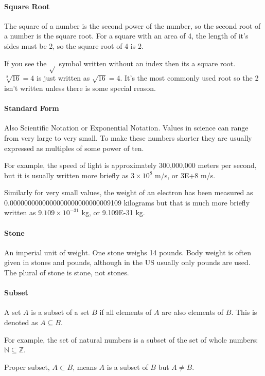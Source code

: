 \documentclass[12pt]{article}
\begin{document}
\paragraph{Square Root}
The square of a number is the second power of the number, so the second root of a number is the square root. For a square with an area of 4, the length of it’s sides must be 2, so the square root of 4 is 2.

If you see the $\sqrt{}$ symbol written without an index then its a square root.  $\sqrt[2]{16} = 4$ is just written as $\sqrt{16} = 4.$ It’s the most commonly used root so the 2 isn’t written unless there is some special reason.

\paragraph{Standard Form}
Also Scientific Notation or Exponential Notation. Values in science can range from very large to very small. To make these numbers shorter they are usually expressed as multiples of some power of ten.

For example, the speed of light is approximately 300,000,000 meters per second, but it is usually written more briefly as $3\times10^8$ m/s, or 3E+8 m/s.

Similarly for very small values, the weight of an electron has been measured as\\0.0000000000000000000000000009109 kilograms but that is much more briefly written as $9.109\times10^{-31}$ kg, or 9.109E-31 kg.

\paragraph{Stone}
An imperial unit of weight. One stone weighs 14 pounds. Body weight is often given in stones and pounds, although in the US usually only pounds are used. The plural of stone is stone, not stones.

\paragraph{Subset}
A set $A$ is a subset of a set $B$ if all elements of $A$ are also elements of $B$. This is denoted as $A \subseteq B$.

For example, the set of natural numbers is a subset of the set of whole numbers: $\mathbb{N} \subseteq \mathbb{Z}$.

Proper subset, \(A \subset B\), means \(A\) is a subset of \(B\) but \(A \neq B\).
\end{document}
